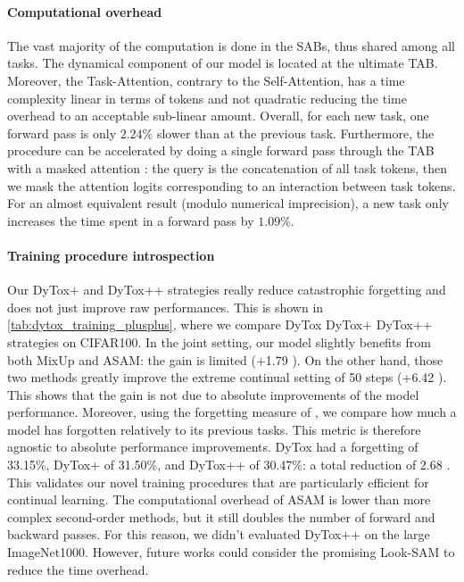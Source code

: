 \label{sec:dytox_comp_over}
\paragraph{Computational overhead} The vast majority of the computation is done in the SABs, thus
shared among all tasks. The dynamical component of our model is located at the ultimate TAB.
Moreover, the Task-Attention, contrary to the Self-Attention, has a time complexity linear in terms
of tokens and not quadratic reducing the time overhead to an acceptable sub-linear amount. Overall,
for each new task, one forward pass is only $2.24\%$ slower than at the previous task.
Furthermore, the procedure can be accelerated by doing a single forward pass through the TAB with
a masked attention \citep{vaswani2017transformer}: the query is the concatenation of all task
tokens, then we mask the attention logits corresponding to an interaction between task tokens. For
an almost equivalent result (modulo numerical imprecision), a new task only increases the time spent
in a forward pass by $1.09\%$.



\paragraph{Training procedure introspection} Our DyTox+ and DyTox++ strategies really reduce
catastrophic forgetting and does not just improve raw performances. This is shown in
\autoref{tab:dytox_training_plusplus}, where we compare DyTox \vs DyTox+ \vs DyTox++ strategies on
CIFAR100. In the joint setting, our model slightly benefits from both MixUp and ASAM: the gain is
limited (+1.79 \pp). On the other hand, those two methods greatly improve the extreme
continual setting of 50 steps (+6.42 \pp). This shows that the gain is not due to absolute
improvements of the model performance. Moreover, using the forgetting measure of
\citet{chaudhry2018riemannien_walk}, we compare how much a model has forgotten relatively to its
previous tasks. This metric is therefore agnostic to absolute performance improvements. DyTox had a
forgetting of 33.15\%, DyTox+ of 31.50\%, and DyTox++ of 30.47\%: a total reduction of 2.68 \pp.
This validates our novel training procedures that are particularly efficient for continual learning.
The computational overhead of ASAM is lower than more complex second-order methods, but it still
doubles the number of forward and backward passes. For this reason, we didn't evaluated DyTox++ on
the large ImageNet1000. However, future works could consider the promising Look-SAM
\cite{liu2021looksam} to reduce the time overhead.

